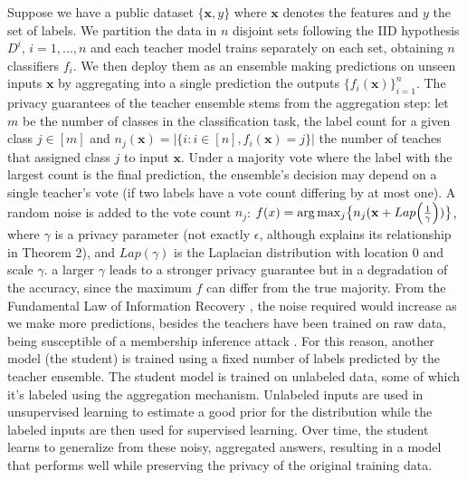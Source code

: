 Suppose we have a public dataset $\{\mathbf{x}, y\}$ where $\mathbf{x}$ denotes the features and $y$ the set of labels. We partition the data in $n$ disjoint sets following the IID hypothesis $D^i$, $i=1,...,n$ and each teacher model trains separately on each set, obtaining $n$ classifiers $f_i$. We then deploy them as an ensemble making predictions on unseen inputs $\mathbf{x}$ by aggregating into a single prediction the outputs $\{f_i(\mathbf{x})\}_{i=1}^n$.
The privacy guarantees of the teacher ensemble stems from the aggregation step: let $m$ be the number of classes in the classification task, the label count for a given class $j \in [m]$ and $n_j (\mathbf{x}) = |\{i \colon i \in [n], f_i(\mathbf{x}) = j\}|$ the number of teaches that assigned class $j$ to input $\mathbf{x}$. Under a majority vote where the label with the largest count is the final prediction, the ensemble's decision may depend on a single teacher's vote (if two labels have a vote count differing by at most one). A random noise is added to the vote count $n_j$: $f(x) = \arg \max_j \bigl\{ n_j (\mathbf{x} + Lap\Bigl( \frac{1}{\gamma} \Bigr)) \bigr\}$, where $\gamma$ is a privacy parameter (not exactly $\epsilon$, although \cite{papernot2017} explains its relationship in Theorem 2), and $Lap(\gamma)$ is the Laplacian distribution with location $0$ and scale $\gamma$. a larger $\gamma$ leads to a stronger privacy guarantee but in a degradation of the accuracy, since the maximum $f$ can differ from the true majority. From the Fundamental Law of Information Recovery \cite{dwork2013}, the noise required would increase as we make more predictions, besides the teachers have been trained on raw data, being susceptible of a membership inference attack \cite{shokri2017}.
For this reason, another model (the student) is trained using a fixed number of labels predicted by the teacher ensemble. The student model is trained on unlabeled data, some of which it's labeled using the aggregation mechanism. Unlabeled inputs are used in unsupervised learning to estimate a good prior for the distribution while the labeled inputs are then used for supervised learning.  Over time, the student learns to generalize from these noisy, aggregated answers, resulting in a model that performs well while preserving the privacy of the original training data.\\

